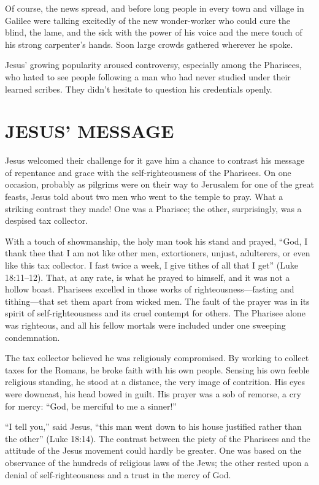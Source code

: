 Of course, the news spread, and before long people in every town and village in Galilee were talking
excitedly of the new wonder-worker who could cure the blind, the lame, and the sick with the power
of his voice and the mere touch of his strong carpenter’s hands. Soon large crowds gathered wherever
he spoke.

Jesus’ growing popularity aroused controversy, especially among the Pharisees, who hated to see
people following a man who had never studied under their learned scribes. They didn’t hesitate to
question his credentials openly.

\section{JESUS’ MESSAGE}

Jesus welcomed their challenge for it gave him a chance to contrast his message of repentance and
grace with the self-righteousness of the Pharisees. On one occasion, probably as pilgrims were on
their way to Jerusalem for one of the great feasts, Jesus told about two men who went to the temple
to pray. What a striking contrast they made! One was a Pharisee; the other, surprisingly, was a
despised tax collector.

With a touch of showmanship, the holy man took his stand and prayed, “God, I thank thee that I am
not like other men, extortioners, unjust, adulterers, or even like this tax collector. I fast twice
a week, I give tithes of all that I get” (Luke 18:11–12). That, at any rate, is what he prayed to
himself, and it was not a hollow boast. Pharisees excelled in those works of righteousness—fasting
and tithing—that set them apart from wicked men. The fault of the prayer was in its spirit of
self-righteousness and its cruel contempt for others. The Pharisee alone was righteous, and all his
fellow mortals were included under one sweeping condemnation.

The tax collector believed he was religiously compromised. By working to collect taxes for the
Romans, he broke faith with his own people. Sensing his own feeble religious standing, he stood at a
distance, the very image of contrition. His eyes were downcast, his head bowed in guilt. His prayer
was a sob of remorse, a cry for mercy: “God, be merciful to me a sinner!”

“I tell you,” said Jesus, “this man went down to his house justified rather than the other” (Luke
18:14). The contrast between the piety of the Pharisees and the attitude of the Jesus movement could
hardly be greater. One was based on the observance of the hundreds of religious laws of the Jews;
the other rested upon a denial of self-righteousness and a trust in the mercy of God.


